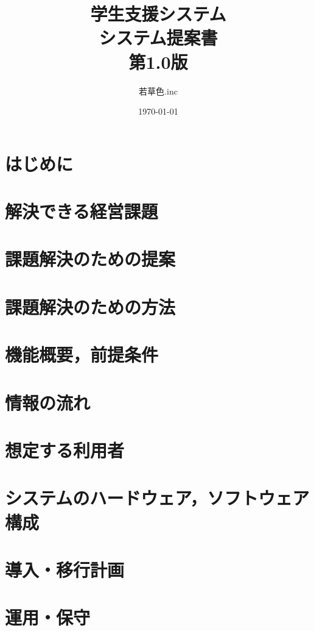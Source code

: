 \documentclass[a4j]{jarticle}
\title{
\vspace{30mm}
{\small 学生支援システム} 
\\
\vspace{5mm}
{\bf システム提案書\\}
\vspace{5mm}
{\small 第1.0版}
\vspace{90mm}
}
\date{\today}
\author{
\vspace{5mm}
  若草色.inc
\vspace{10mm}
}
\begin{document}
\maketitle

\newpage


\section{はじめに}



\section{解決できる経営課題}


\section{課題解決のための提案}


\section{課題解決のための方法}


\section{機能概要，前提条件}


\section{情報の流れ}


\section{想定する利用者}


\section{システムのハードウェア，ソフトウェア構成}


\section{導入・移行計画}


\section{運用・保守}

\end{document}
